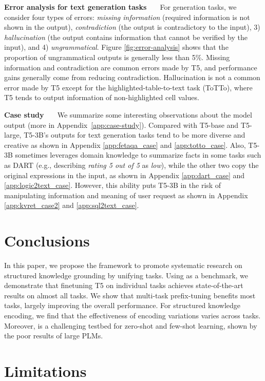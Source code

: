 \noindent\textbf{Error analysis for text generation tasks \ \ } 
For generation tasks, we consider four types of errors: \textit{missing information} (required information is not shown in the output), \textit{contradiction} (the output is contradictory to the input), 3) \textit{hallucination} (the output contains information that cannot be verified by the input), and 4) \textit{ungrammatical}. 
Figure \ref{fig:error-analysis} shows that the proportion of ungrammatical outputs is generally less than 5\%. 
Missing information and contradiction are common errors made by T5, and performance gains generally come from reducing contradiction. 
Hallucination is not a common error made by T5 except for the highlighted-table-to-text task (ToTTo), where T5 tends to output information of non-highlighted cell values.

\noindent\textbf{Case study \ \ }
We summarize some interesting observations about the model output (more in Appendix~\ref{app:case-study}).
Compared with T5-base and T5-large, T5-3B's outputs for text generation tasks tend to be more diverse and creative as shown in Appendix \ref{app:fetaqa_case} and \ref{app:totto_case}.
Also, T5-3B sometimes leverages domain knowledge to summarize facts in some tasks such as DART (e.g., describing \textit{rating 5 out of 5} as \textit{low}), while the other two copy the original expressions in the input, as shown in Appendix \ref{app:dart_case} and \ref{app:logic2text_case}.
However, this ability puts T5-3B in the risk of manipulating information and meaning of user request as shown in Appendix \ref{app:kvret_case2} and \ref{app:sql2text_case}. 

\section{Conclusions}
In this paper, we propose the \uskg framework to promote systematic research on structured knowledge grounding by unifying \ntasks \skg tasks. Using \uskg as a benchmark, we demonstrate that finetuning T5 on individual tasks achieves state-of-the-art results on almost all \ntasks tasks. 
We show that multi-task prefix-tuning benefits most \skg tasks, largely improving the overall performance. 
For structured knowledge encoding, we find that the effectiveness of encoding variations varies across tasks. 
Moreover, \uskg is a challenging testbed for zero-shot and few-shot learning, shown by the poor results of large PLMs. 

\section{Limitations}


